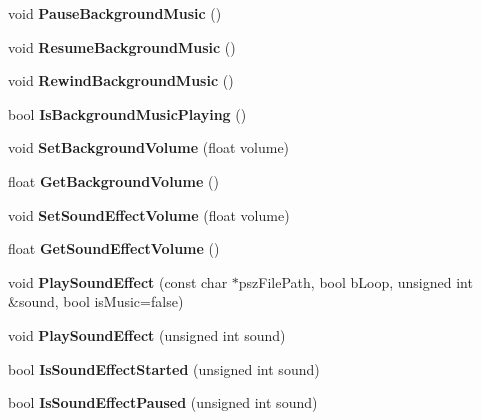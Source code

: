 \begin{DoxyCompactItemize}
void {\bfseries Pause\+Background\+Music} ()
\item 
\mbox{\label{classAudio_a00d39f6f27961933145bcbad23688309}} 
void {\bfseries Resume\+Background\+Music} ()
\item 
\mbox{\label{classAudio_a4ff36f2673e6e77df890f3e5345c8421}} 
void {\bfseries Rewind\+Background\+Music} ()
\item 
\mbox{\label{classAudio_abc3c852c177dad5d2af4bb2ee679fafe}} 
bool {\bfseries Is\+Background\+Music\+Playing} ()
\item 
\mbox{\label{classAudio_aabe66343a479443257adc77d46c39e47}} 
void {\bfseries Set\+Background\+Volume} (float volume)
\item 
\mbox{\label{classAudio_a625afba47cd1950283ffbcb5503b0aec}} 
float {\bfseries Get\+Background\+Volume} ()
\item 
\mbox{\label{classAudio_a8f2004ed4e6e338b625d2657eff5abb5}} 
void {\bfseries Set\+Sound\+Effect\+Volume} (float volume)
\item 
\mbox{\label{classAudio_ab6a5f3724d7b87838a7881e2a9aa5629}} 
float {\bfseries Get\+Sound\+Effect\+Volume} ()
\item 
\mbox{\label{classAudio_a2b0031304a668114b79d97c0ee453d65}} 
void {\bfseries Play\+Sound\+Effect} (const char $\ast$psz\+File\+Path, bool b\+Loop, unsigned int \&sound, bool is\+Music=false)
\item 
\mbox{\label{classAudio_a746409db5a8474fedf46824722aad8cd}} 
void {\bfseries Play\+Sound\+Effect} (unsigned int sound)
\item 
\mbox{\label{classAudio_accce27fe5781c9cb2c2d646f6bd86a8e}} 
bool {\bfseries Is\+Sound\+Effect\+Started} (unsigned int sound)
\item 
\mbox{\label{classAudio_a711ded36498e6ebea4a5b06e0d73edba}} 
bool {\bfseries Is\+Sound\+Effect\+Paused} (unsigned int sound)
\item 
\mbox{\label{classAudio_a38c90ca893e1397827bd10b4c99cee56}} 

\end{DoxyCompactItemize}

